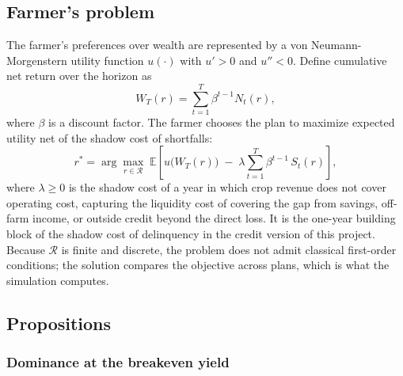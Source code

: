\documentclass[11pt,letterpaper]{article}
\theoremstyle{remark}
\begin{document}
\subsection{\label{subsec:farmer_problem}Farmer's problem}

The farmer's preferences over wealth are represented by a von Neumann-Morgenstern utility function $u(\cdot)$ with $u' > 0$ and $u'' < 0$. Define cumulative net return over the horizon as
\begin{equation}
W_T(r) = \sum_{t=1}^{T} \beta^{t-1} N_t(r),
\end{equation}
where $\beta$ is a discount factor. The farmer chooses the plan to maximize expected utility net of the shadow cost of shortfalls:
\begin{equation}
r^{*} = \arg\max_{r \in \mathcal{R}}\;\mathbb{E}\!\left[u\!\bigl(W_T(r)\bigr)\;-\;\lambda \sum_{t=1}^{T} \beta^{t-1}\,S_t(r)\right],
\end{equation}
where $\lambda \geq 0$ is the shadow cost of a year in which crop revenue does not cover operating cost, capturing the liquidity cost of covering the gap from savings, off-farm income, or outside credit beyond the direct loss. It is the one-year building block of the shadow cost of delinquency in the credit version of this project. Because $\mathcal{R}$ is finite and discrete, the problem does not admit classical first-order conditions; the solution compares the objective across plans, which is what the simulation computes.

\subsection{\label{subsec:propositions}Propositions}

\subsubsection{\label{subsubsec:proposition_1}Dominance at the breakeven yield}
\end{document}
